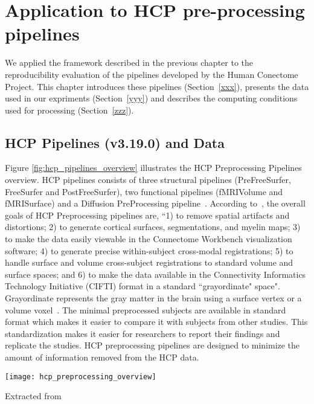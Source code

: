 \chapter{Application to HCP pre-processing pipelines}

We applied the framework described in the previous chapter to the
reproducibility evaluation of the pipelines developed by the Human
Conectome Project. This chapter introduces these pipelines
(Section~\ref{xxx}), presents the data used in our expriments
(Section~\ref{yyy}) and describes the computing conditions used for
processing (Section~\ref{zzz}).

\section{HCP Pipelines (v3.19.0) and Data}
Figure \ref{fig:hcp_pipelines_overview} illustrates the HCP Preprocessing Pipelines overview. HCP pipelines consists of three structural pipelines (PreFreeSurfer, FreeSurfer and PostFreeSurfer), two functional pipelines (fMRIVolume and fMRISurface) and a Diffusion PreProcessing pipeline~\cite{Gla13}. According to~\cite{Gla13}, the overall goals of HCP Preprocessing pipelines are, ``1) to remove spatial artifacts and distortions; 2) to generate cortical surfaces, segmentations, and myelin maps; 3) to make the data easily viewable in the Connectome Workbench visualization software; 4) to generate precise within-subject cross-modal registrations; 5) to handle surface and volume cross-subject registrations to standard volume and surface spaces; and 6) to make the data available in the Connectivity Informatics Technology Initiative (CIFTI) format in a standard ``grayordinate" space". Grayordinate represents the gray matter in the brain using a surface vertex or a volume voxel~\cite{Grayordinate}. The minimal preprocessed subjects are available in standard format which makes it easier to compare it with subjects from other studies. This standardization makes it easier for researchers to report their findings and replicate the studies. HCP preprocessing pipelines are designed to minimize the amount of information removed from the HCP data.

\begin{center}
   \texttt{[image: hcp\_preprocessing\_overview]}
   \label{fig:hcp_pipelines_overview}
   \caption*{Extracted from \cite{Gla13}}
\end{center}

